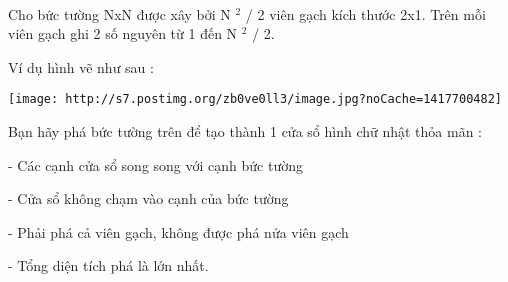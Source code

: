  

Cho bức tường NxN được xây bởi N $^ 2 $ / 2 viên gạch kích thước 2x1. Trên mỗi viên gạch ghi 2 số nguyên từ 1 đến N $^ 2 $ / 2.

Ví dụ hình vẽ như sau :


\texttt{[image: http://s7.postimg.org/zb0ve0ll3/image.jpg?noCache=1417700482]}

Bạn hãy phá bức tường trên để tạo thành 1 cửa sổ hình chữ nhật thỏa mãn :

- Các cạnh cửa sổ song song với cạnh bức tường

- Cửa sổ không chạm vào cạnh của bức tường

- Phải phá cả viên gạch, không được phá nửa viên gạch

- Tổng diện tích phá là lớn nhất.

 